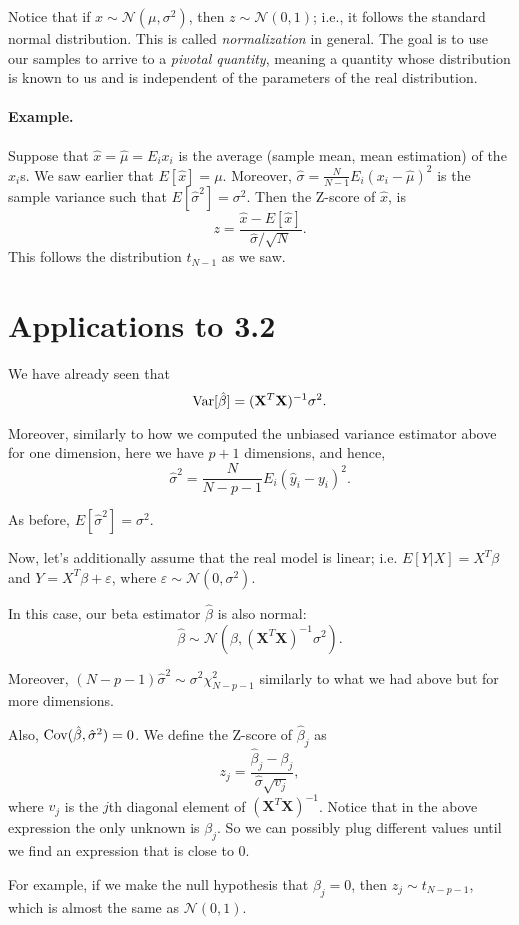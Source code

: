 \documentclass[11pt]{article}
\theoremstyle{definition}
\newcommand{\XX}{\mathbf{X}}
\newcommand{\Normal}[2]{\ensuremath{\mathcal N (#1, #2)}}
\begin{document}
Notice that if $x\sim\Normal{\mu}{\sigma^2}$, then $z\sim\Normal 0 1$; i.e., it
follows the standard normal distribution. This is called \emph{normalization} in
general. The goal is to use our samples to arrive to a \emph{pivotal quantity},
meaning a quantity whose distribution is known to us and is independent of the
parameters of the real distribution.

\paragraph{Example.} Suppose that $\hat x=\hat\mu=E_i x_i$ is the average (sample mean,
mean estimation) of the $x_i$s. We saw earlier that $E[\hat{x}]=\mu$. Moreover,
$\hat\sigma=\frac{N}{N-1}E_i(x_i-\hat\mu)^2$ is the sample variance such that
$E[\hat\sigma^2]=\sigma^2$. Then the Z-score of $\hat x$, is 
\[z=\frac{\hat x-E[\hat x]}{\hat\sigma/\sqrt{N}}.\]
This follows the distribution $t_{N-1}$ as we saw.

\section{Applications to 3.2}
We have already seen that
\[\Var[\hat\beta]=(\XX^T\XX)^{-1}\sigma^2.\]

Moreover, similarly to how we computed the unbiased variance estimator above for
one dimension, here we have $p+1$ dimensions, and hence,
\[\hat\sigma^2=\frac{N}{N-p-1}E_i(\hat y_i-y_i)^2.\]

As before, $E[\hat\sigma^2]=\sigma^2$.

Now, let's additionally assume that the real model is linear; i.e.
$E[Y|X]=X^T\beta$ and $Y=X^T\beta+\varepsilon$, where
$\varepsilon\sim\Normal{0}{\sigma^2}$. 

In this case, our beta estimator $\hat\beta$ is also normal:
\[\hat\beta\sim\Normal{\beta}{(\XX^T\XX)^{-1}\sigma^2}.\]

Moreover, $(N-p-1)\hat\sigma^2\sim\sigma^2\chi^2_{N-p-1}$ similarly to what we 
had above but for more dimensions.

Also, $\operatorname*{Cov}(\hat\beta,\hat\sigma^2)=0$. We define the Z-score of $\hat\beta_j$
as
\[z_j=\frac{\hat\beta_j-\beta_j}{\hat\sigma\sqrt{v_j}},\] where $v_j$ is the
$j$th diagonal element of $(\XX^T\XX)^{-1}$. Notice that in the above expression
the only unknown is $\beta_j$. So we can possibly plug different values until we
find an expression that is close to 0.

For example, if we make the null hypothesis that $\beta_j=0$, then $z_j\sim
t_{N-p-1}$, which is almost the same as $\Normal 0 1$.
\end{document}
